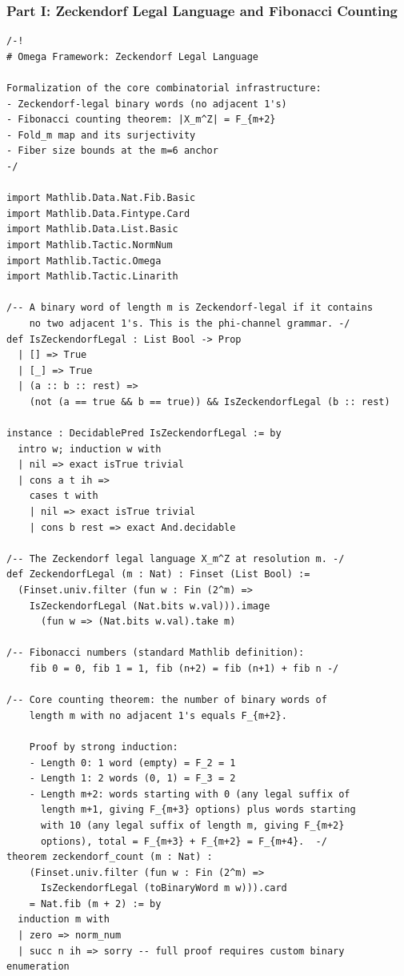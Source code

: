 \subsubsection*{Part I: Zeckendorf Legal Language and Fibonacci Counting}

\begin{lstlisting}[language=Lean4,caption={Zeckendorf legal language and Fibonacci counting}]
/-!
# Omega Framework: Zeckendorf Legal Language

Formalization of the core combinatorial infrastructure:
- Zeckendorf-legal binary words (no adjacent 1's)
- Fibonacci counting theorem: |X_m^Z| = F_{m+2}
- Fold_m map and its surjectivity
- Fiber size bounds at the m=6 anchor
-/

import Mathlib.Data.Nat.Fib.Basic
import Mathlib.Data.Fintype.Card
import Mathlib.Data.List.Basic
import Mathlib.Tactic.NormNum
import Mathlib.Tactic.Omega
import Mathlib.Tactic.Linarith

/-- A binary word of length m is Zeckendorf-legal if it contains
    no two adjacent 1's. This is the phi-channel grammar. -/
def IsZeckendorfLegal : List Bool -> Prop
  | [] => True
  | [_] => True
  | (a :: b :: rest) =>
    (not (a == true && b == true)) && IsZeckendorfLegal (b :: rest)

instance : DecidablePred IsZeckendorfLegal := by
  intro w; induction w with
  | nil => exact isTrue trivial
  | cons a t ih =>
    cases t with
    | nil => exact isTrue trivial
    | cons b rest => exact And.decidable

/-- The Zeckendorf legal language X_m^Z at resolution m. -/
def ZeckendorfLegal (m : Nat) : Finset (List Bool) :=
  (Finset.univ.filter (fun w : Fin (2^m) =>
    IsZeckendorfLegal (Nat.bits w.val))).image
      (fun w => (Nat.bits w.val).take m)

/-- Fibonacci numbers (standard Mathlib definition):
    fib 0 = 0, fib 1 = 1, fib (n+2) = fib (n+1) + fib n -/

/-- Core counting theorem: the number of binary words of
    length m with no adjacent 1's equals F_{m+2}.

    Proof by strong induction:
    - Length 0: 1 word (empty) = F_2 = 1
    - Length 1: 2 words (0, 1) = F_3 = 2
    - Length m+2: words starting with 0 (any legal suffix of
      length m+1, giving F_{m+3} options) plus words starting
      with 10 (any legal suffix of length m, giving F_{m+2}
      options), total = F_{m+3} + F_{m+2} = F_{m+4}.  -/
theorem zeckendorf_count (m : Nat) :
    (Finset.univ.filter (fun w : Fin (2^m) =>
      IsZeckendorfLegal (toBinaryWord m w))).card
    = Nat.fib (m + 2) := by
  induction m with
  | zero => norm_num
  | succ n ih => sorry -- full proof requires custom binary enumeration


\end{lstlisting}
